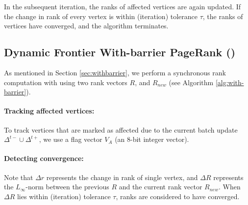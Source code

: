 In the subsequent iteration, the ranks of affected vertices are again updated. If the change in rank of every vertex is within (iteration) tolerance $\tau$, the ranks of vertices have converged, and the algorithm terminates.



\subsection{Dynamic Frontier With-barrier PageRank (\FroWbar{})}
\label{sec:frontier-withbarrier}

As mentioned in Section \ref{sec:withbarrier}, we perform a synchronous rank computation with \FroWbar{} using two rank vectors $R$, and $R_{new}$ (see Algorithm \ref{alg:with-barrier}).

\paragraph{Tracking affected vertices:}

To track vertices that are marked as affected due to the current batch update $\Delta^{t-} \cup \Delta^{t+}$, we use a flag vector $V_A$ (an 8-bit integer vector).

\paragraph{Detecting convergence:}

Note that $\Delta r$ represents the change in rank of single vertex, and $\Delta R$ represents the $L_\infty$-norm between the previous $R$ and the current rank vector $R_{new}$. When $\Delta R$ lies within (iteration) tolerance $\tau$, ranks are considered to have converged.



